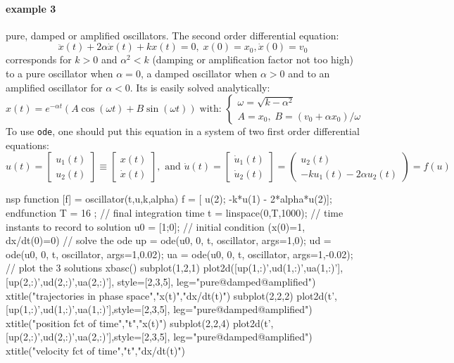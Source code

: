 \begin{examples}
\paragraph{example 3} pure, damped or amplified oscillators. The second order differential
equation:
$$
  \ddot{x}(t) + 2 \alpha \dot{x}(t) + k x(t) = 0, \; x(0)=x_0, \dot{x}(0) = v_0 
$$ 
corresponds for $k > 0$ and $\alpha^2 < k$ (damping or amplification factor not too high) to 
a pure oscillator when $\alpha=0$, a damped oscillator when $\alpha>0$ and to an amplified 
oscillator for $\alpha<0$. Its is easily solved analytically:
$$
  x(t) = e^{-\alpha t}( A \cos(\omega t) + B \sin(\omega t) ) \; \mbox{with: }
\left\{ \begin{array}{l}
\omega = \sqrt{k - \alpha^2} \\
A = x_0, \; B = (v_0 + \alpha x_0)/\omega
\end{array} \right.
$$
To use {\tt ode}, one should put this equation in a system of two first order differential 
equations:
$$
u(t) =  \left[ \begin{array}{c} u_1(t) \\  u_2(t)\end{array} \right]  \equiv  \left[ \begin{array}{c} x(t) \\
    \dot{x}(t)\end{array} \right], \mbox{ and }
\dot{u}(t) =  \left[ \begin{array}{c} \dot{u}_1(t) \\ \dot{u}_2(t) \end{array} \right] =
    \left( \begin{array}{c} u_2(t) \\  -k u_1(t) - 2 \alpha u_2(t) \end{array} \right) = f(u)
$$
\begin{mintednsp}{nsp}
function [f] = oscillator(t,u,k,alpha)
   f = [ u(2); -k*u(1) - 2*alpha*u(2)];
endfunction
T = 16 ;  // final integration time
t = linspace(0,T,1000); // time instants to record to solution
u0 = [1;0];  // initial condition (x(0)=1, dx/dt(0)=0)
// solve the ode
up = ode(u0, 0, t, oscillator, args={1,0});
ud = ode(u0, 0, t, oscillator, args={1,0.02});
ua = ode(u0, 0, t, oscillator, args={1,-0.02});
// plot the 3 solutions
xbasc()
subplot(1,2,1)
plot2d([up(1,:)',ud(1,:)',ua(1,:)'],[up(2,:)',ud(2,:)',ua(2,:)'], style=[2,3,5], leg="pure@damped@amplified")
xtitle("trajectories in phase space","x(t)","dx/dt(t)")
subplot(2,2,2)
plot2d(t',[up(1,:)',ud(1,:)',ua(1,:)'],style=[2,3,5], leg="pure@damped@amplified")
xtitle("position fct of time","t","x(t)")
subplot(2,2,4)
plot2d(t',[up(2,:)',ud(2,:)',ua(2,:)'],style=[2,3,5], leg="pure@damped@amplified")
xtitle("velocity fct of time","t","dx/dt(t)")
\end{mintednsp}
 

\end{examples}
